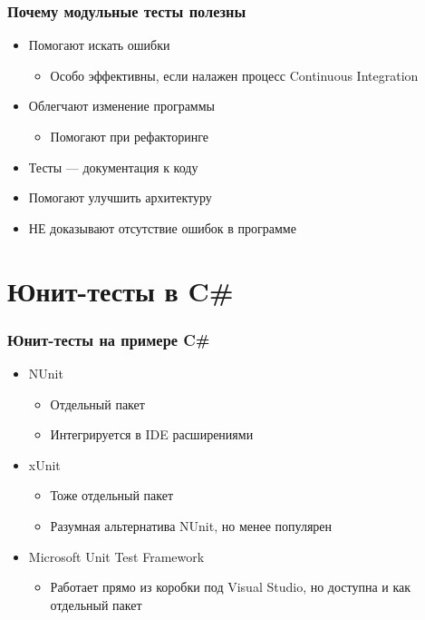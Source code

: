 \documentclass{../../slides-style}
\begin{document}
    \begin{frame}
        \frametitle{Почему модульные тесты полезны}
        \begin{itemize}
            \item Помогают искать ошибки
            \begin{itemize}
                \item Особо эффективны, если налажен процесс Continuous Integration
            \end{itemize}
            \item Облегчают изменение программы
            \begin{itemize}
                \item Помогают при рефакторинге
            \end{itemize}
            \item Тесты --- документация к коду
            \item Помогают улучшить архитектуру
            \item НЕ доказывают отсутствие ошибок в программе
        \end{itemize}
    \end{frame}

    \section{Юнит-тесты в C\#}

    \begin{frame}
        \frametitle{Юнит-тесты на примере C\#}
        \begin{itemize}
            \item NUnit
            \begin{itemize}
                \item Отдельный пакет
                \item Интегрируется в IDE расширениями
            \end{itemize}
            \item xUnit
            \begin{itemize}
                \item Тоже отдельный пакет
                \item Разумная альтернатива NUnit, но менее популярен
            \end{itemize}
            \item Microsoft Unit Test Framework
            \begin{itemize}
                \item Работает прямо из коробки под Visual Studio, но доступна и как отдельный пакет
            \end{itemize}
        \end{itemize}
    \end{frame}
\end{document}

